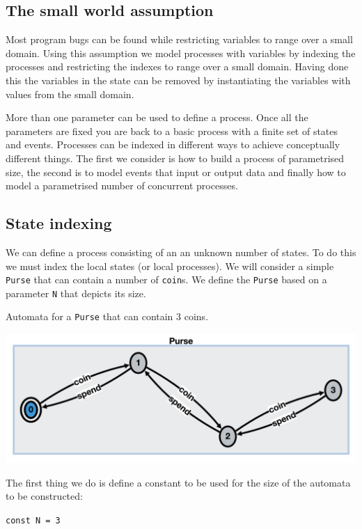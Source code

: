 \documentclass[]{article}
\begin{document}
\subsection{The small world assumption}

Most program bugs can be found while restricting variables to range over a small domain. Using this assumption we  model processes with variables by indexing the processes and restricting the indexes to range over a small domain. Having done this the variables in the state can be removed by instantiating the variables with values from the small domain.

More than one parameter can be used to define a process.  Once all the parameters are fixed you are back to a basic process with a finite set of states and events. 
Processes can be indexed in different ways to achieve  conceptually different things. The first we consider is how to build a process of parametrised    size,  the second is to model events that input or output data and finally how to model a parametrised number of concurrent processes.

\subsection{State indexing}

We can define a process consisting of an  an unknown number of states. To do this we must index the local states (or local processes).
We will consider a simple \verb|Purse| that can contain a number of \verb|coin|s. We define the \verb|Purse| based on a parameter \verb|N| that depicts its size.
\noindent\begin{center} 
Automata for a \verb|Purse| that can contain 3 coins.

\includegraphics[scale=0.15]{Purse.jpg} \end{center}


The first thing we do is define a constant to be used for the size of the automata to be constructed:

\hspace{0.5in}\verb$const N = 3$
\end{document}
